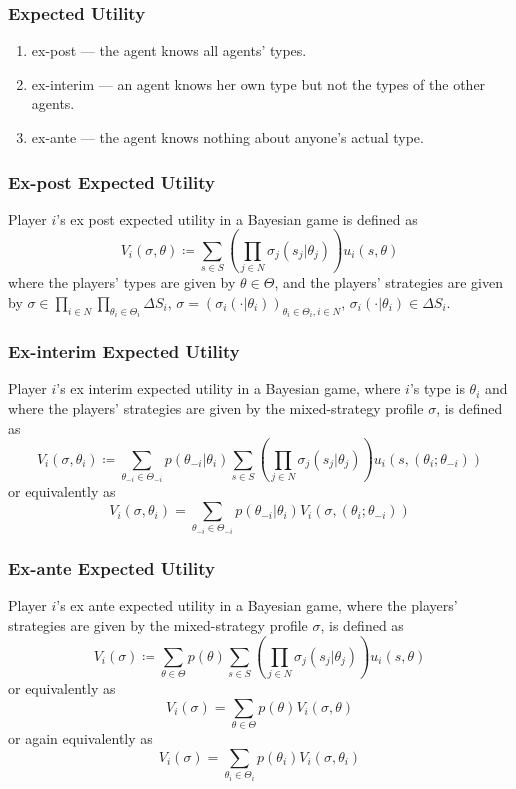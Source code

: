 \documentclass[UTF8,11pt,colorlinks,compress,openany]{beamer}%
\begin{document}
\begin{frame}\frametitle{Expected Utility}
\begin{enumerate}
	\item ex-post --- the agent knows all agents' types.
	\item ex-interim --- an agent knows her own type but not the types of the other agents.
	\item ex-ante --- the agent knows nothing about anyone's actual type.
\end{enumerate}
\end{frame}

\begin{frame}\frametitle{Ex-post Expected Utility}
\begin{definition}
	Player $i$'s ex post expected utility in a Bayesian game is defined as
	\[V_i(\sigma,\theta)\coloneqq \sum\limits_{s\in S}\left(\prod\limits_{j\in N}\sigma_j(s_j|\theta_j)\right)u_i(s,\theta)\]
	where the players' types are given by $\theta\in\Theta$, and the players' strategies are given by $\sigma\in\prod\limits_{i\in N}\prod\limits_{\theta_i\in\Theta_i}\Delta S_i$, $\sigma=(\sigma_i(\cdot|\theta_i))_{\theta_i\in\Theta_i,i\in N}$, $\sigma_i(\cdot|\theta_i)\in\Delta S_i$.
\end{definition}	
\end{frame}

\begin{frame}\frametitle{Ex-interim Expected Utility}
\begin{definition}
	Player $i$'s ex interim expected utility in a Bayesian game, where $i$'s type is $\theta_i$ and where the players' strategies are given by the mixed-strategy profile $\sigma$, is defined as
	\[V_i(\sigma,\theta_i)\coloneqq \sum\limits_{\theta_{-i}\in\Theta_{-i}}p(\theta_{-i}|\theta_i)\sum\limits_{s\in S}\left(\prod\limits_{j\in N}\sigma_j(s_j|\theta_j)\right)u_i(s,(\theta_i;\theta_{-i}))\]
	or equivalently as
	\[V_i(\sigma,\theta_i)=\sum\limits_{\theta_{-i}\in\Theta_{-i}}p(\theta_{-i}|\theta_i)V_i(\sigma,(\theta_i;\theta_{-i}))\]
\end{definition}
\end{frame}

\begin{frame}\frametitle{Ex-ante Expected Utility}
\begin{definition}
	Player $i$'s ex ante expected utility in a Bayesian game, where the players' strategies are given by the mixed-strategy profile $\sigma$, is defined as
	\[V_i(\sigma)\coloneqq \sum\limits_{\theta\in\Theta}p(\theta)\sum\limits_{s\in S}\left(\prod\limits_{j\in N}\sigma_j(s_j|\theta_j)\right)u_i(s,\theta)\]
	or equivalently as
	\[V_i(\sigma)=\sum\limits_{\theta\in\Theta}p(\theta)V_i(\sigma,\theta)\]
	or again equivalently as
	\[V_i(\sigma)=\sum\limits_{\theta_i\in\Theta_i}p(\theta_i)V_i(\sigma,\theta_i)\]
\end{definition}	
\end{frame}
\end{document}
